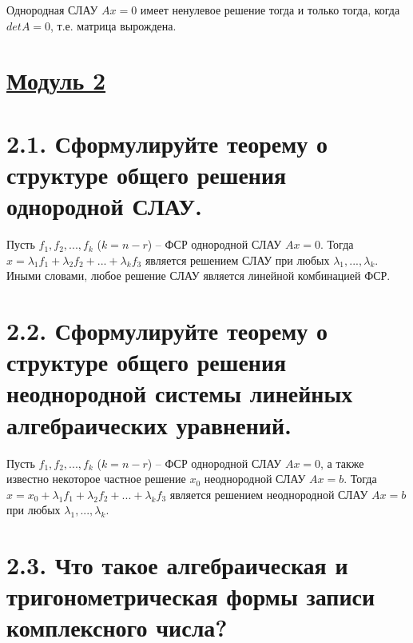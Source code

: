 \documentclass{article}
\begin{document}
Однородная СЛАУ $Ax = 0$ имеет ненулевое решение тогда и только тогда, когда $detA = 0$, т.е. матрица вырождена.

\newpage
{}
\section*{\LARGE\centering \underline{Модуль 2}}

\section*{\LARGE 2.1. Сформулируйте теорему о структуре общего решения однородной СЛАУ.  }

Пусть $f_1, f_2, ..., f_k$ ($k = n - r$) -- ФСР однородной СЛАУ $Ax = 0$. Тогда $x = \lambda_1f_1 + \lambda_2f_2 + ... + \lambda_kf_3$ является решением СЛАУ при любых $\lambda_1, ..., \lambda_k$. Иными словами, любое решение СЛАУ является линейной комбинацией ФСР.

\section*{\LARGE 2.2. Сформулируйте теорему о структуре общего решения неоднородной системы линейных алгебраических уравнений. }

Пусть $f_1, f_2, ..., f_k$ ($k = n - r$) -- ФСР однородной СЛАУ $Ax = 0$, а также известно некоторое частное решение $x_0$ неоднородной СЛАУ $Ax = b$. Тогда $x = x_0 + \lambda_1f_1 + \lambda_2f_2 + ... + \lambda_kf_3$ является решением неоднородной СЛАУ $Ax = b$ при любых $\lambda_1, ..., \lambda_k$.

\section*{\LARGE 2.3. Что такое алгебраическая и тригонометрическая формы записи комплексного числа? }
\end{document}
